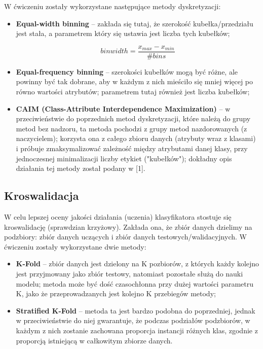         \noindent
        W ćwiczeniu zostały wykorzystane następujące metody dyskretyzacji:
        \begin{itemize}
            \item{\textbf{Equal-width binning} -- zakłada się tutaj, że szerokość kubełka/przedziału jest stała,
                   a parametrem który się ustawia jest liczba tych kubełków;}

             $$ binwidth = \frac{x_{max} - x_{min}}{\#bins} $$

            \item{\textbf{Equal-frequency binning} -- szerokości kubełków mogą być różne, ale powinny być tak
                  dobrane, aby w każdym z nich mieściło się mniej więcej po równo wartości atrybutów; parametrem
                  tutaj również jest liczba kubełków;}

            \item{\textbf{CAIM (Class-Attribute Interdependence Maximization)} -- w przeciwieństwie do poprzednich
                  metod dyskretyzacji, które należą do grupy metod bez nadzoru, ta metoda pochodzi z grupy metod
                  nazdorowanych (z naczycielem); korzysta ona z całego zbioru danych (atrybuty wraz z klasami) i
                  próbuje zmaksymalizować zależność między atrybutami danej klasy, przy jednoczesnej minimalizacji
                  liczby etykiet ("kubełków"); dokładny opis działania tej metody został podany w [1].}
        \end{itemize}

    \subsection{Kroswalidacja}
        W celu lepszej oceny jakości działania (uczenia) klasyfikatora stostuje się kroswalidację (sprawdzian
        krzyżowy). Zakłada ona, że zbiór danych dzielimy na podzbiory: zbiór danych uczących i zbiór danych
        testowych/walidacyjnych. W ćwiczeniu zostały wykorzystane dwie metody:
        \begin{itemize}
            \item{\textbf{K-Fold} -- zbiór danych jest dzielony na K pozbiorów, z których każdy kolejno jest
                  przyjmowany jako zbiór testowy, natomiast pozostałe służą do nauki modelu; metoda może być
                  dość czasochłonna przy dużej wartości parametru K, jako że przeprowadzanych jest kolejno
                  K przebiegów metody;}
            \item{\textbf{Stratified K-Fold} -- metoda ta jest bardzo podobna do poprzedniej, jednak w przeciwieństwie
                  do niej gwarantuje, że podczas podziałów podzbiorów, w każdym z nich zostanie zachowana proporcja
                  instancji różnych klas, zgodnie z proporcją istniejącą w całkowitym zbiorze danych.}
        \end{itemize}

